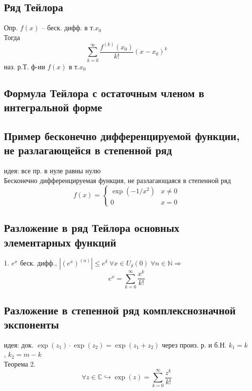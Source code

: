 \documentclass{article}
\begin{document}
\subsection{Ряд Тейлора}
Опр. $f(x)$ -- беск. дифф. в т.$x_0$ \\
Тогда
\begin{equation*}
    \sum_{k=0}^\infty \frac{f^{(k)} (x_0)}{k!} (x-x_0)^k
\end{equation*}
наз. р.Т. ф-ии $f(x)$ в т.$x_0$
\subsection{Формула Тейлора с остаточным членом в интегральной форме}
\subsection{Пример бесконечно дифференцируемой функции, не разлагающейся в степенной ряд}
идея: все пр. в нуле равны нулю \\
Бесконечно дифференцируемая функция, не разлагающаяся в степенной ряд
\begin{equation*}
    f(x) = 
    \begin{cases}
    \exp (-1/x^2) & x \neq 0 \\
    0 & x=0
    \end{cases}
\end{equation*}

\subsection{Разложение в ряд Тейлора основных элементарных функций}
1. $e^x$ беск. дифф., $|(e^x)^{(n)}| \leq e^\delta \; \forall x \in U_\delta (0) \; \forall n \in \mathbb N \Rightarrow$
\begin{equation*}
    e^x = \sum_{k=0}^\infty \frac{x^k}{k!}
\end{equation*}
\subsection{Разложение в степенной ряд комплекснозначной экспоненты}
идея: док. $\exp (z_1) \cdot \exp (z_2) = \exp (z_1+z_2)$ через произ. р. и б.Н. $k_1 = k$, $k_2 = m-k$ \\
Теорема 2.
\begin{equation*}
    \forall z \in \mathbb C \hookrightarrow \exp(z) = \sum_{k=0}^\infty \frac{z^k}{k!}
\end{equation*}
\end{document}

